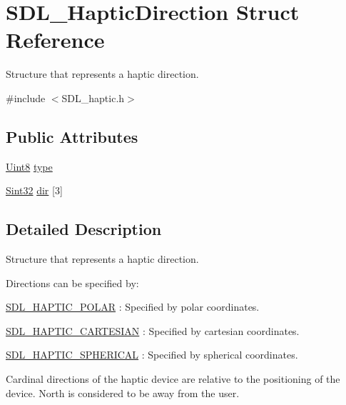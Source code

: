 \hypertarget{struct_s_d_l___haptic_direction}{}\section{S\+D\+L\+\_\+\+Haptic\+Direction Struct Reference}
\label{struct_s_d_l___haptic_direction}


Structure that represents a haptic direction.  




{\ttfamily \#include $<$S\+D\+L\+\_\+haptic.\+h$>$}

\subsection*{Public Attributes}
\begin{DoxyCompactItemize}
\item 
\hyperlink{_s_d_l__stdinc_8h_a2944638813a090aa23e62f4da842c3e2}{Uint8} \hyperlink{struct_s_d_l___haptic_direction_acd6830ad68c4ba2af16057fa418087cc}{type}
\item 
\hyperlink{_s_d_l__stdinc_8h_a7a90b941db9d4582e9ad7abb9940ff7e}{Sint32} \hyperlink{struct_s_d_l___haptic_direction_a6cebd8118a3e61e36bd0c503ae020362}{dir} \mbox{[}3\mbox{]}
\end{DoxyCompactItemize}


\subsection{Detailed Description}
Structure that represents a haptic direction. 

Directions can be specified by\+:
\begin{DoxyItemize}
\item \hyperlink{_s_d_l__haptic_8h_acdc35e97e5525472054a67b76e518f3b}{S\+D\+L\+\_\+\+H\+A\+P\+T\+I\+C\+\_\+\+P\+O\+L\+A\+R} \+: Specified by polar coordinates.
\item \hyperlink{_s_d_l__haptic_8h_af8b2430a363a968de2a5b64c8f663d3b}{S\+D\+L\+\_\+\+H\+A\+P\+T\+I\+C\+\_\+\+C\+A\+R\+T\+E\+S\+I\+A\+N} \+: Specified by cartesian coordinates.
\item \hyperlink{_s_d_l__haptic_8h_a1fcf7cb0eaf3c39b16ba266054e25aff}{S\+D\+L\+\_\+\+H\+A\+P\+T\+I\+C\+\_\+\+S\+P\+H\+E\+R\+I\+C\+A\+L} \+: Specified by spherical coordinates.
\end{DoxyItemize}

Cardinal directions of the haptic device are relative to the positioning of the device. North is considered to be away from the user.

